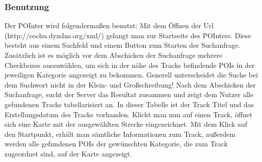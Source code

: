 \subsubsection{Benutzung}
Der POInter wird folgendermaßen benutzt:
Mit dem Öffnen der Url (http://cochu.dyndns.org/xml/) gelangt man zur Startseite des POInters.
Diese besteht aus einem Suchfeld und einem Button zum Starten der Suchanfrage.
Zusätzlich ist es möglich vor dem Abschicken der Suchanfrage mehrere Checkboxes auszuwählen,
um sich in der nähe des Tracks befindende POIs in der jeweiligen Kategorie angezeigt zu bekommen.
Generell unterscheidet die Suche bei dem Suchwort nicht in der Klein- und Großschreibung!
Nach dem Abschicken der Suchanfrage, sucht der Server das Resultat zusammen und zeigt dem Nutzer alle gefundenen
Tracks tabellarisiert an.
In dieser Tabelle ist der Track Titel und das Erstellungsdatum des Tracks vorhanden.
Klickt man nun auf einen Track, öffnet sich eine Karte mit der ausgewählten Strecke eingezeichnet.
Mit dem Klick auf den Startpunkt, erhält man sämtliche Informationen zum Track, außerdem werden alle
gefundenen POIs der gewünschten Kategorie, die zum Track zugeordnet sind, auf der Karte angezeigt.
